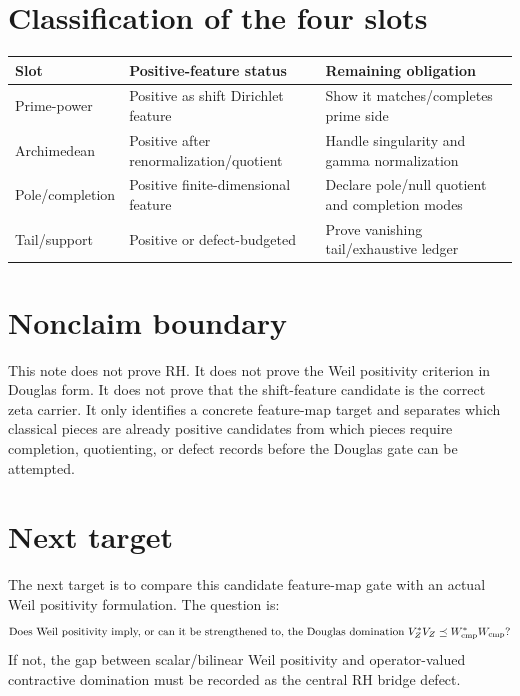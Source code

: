 \documentclass[11pt]{article}
\newcommand{\Wcmp}{W_{\rm cmp}}
\begin{document}
\section{Classification of the four slots}
\begin{center}
\begin{tabular}{lll}
Slot & Positive-feature status & Remaining obligation\\
\hline
Prime-power & Positive as shift Dirichlet feature & Show it matches/completes prime side\\
Archimedean & Positive after renormalization/quotient & Handle singularity and gamma normalization\\
Pole/completion & Positive finite-dimensional feature & Declare pole/null quotient and completion modes\\
Tail/support & Positive or defect-budgeted & Prove vanishing tail/exhaustive ledger\\
\end{tabular}
\end{center}

\section{Nonclaim boundary}
This note does not prove RH.  It does not prove the Weil positivity criterion in
Douglas form.  It does not prove that the shift-feature candidate is the correct
zeta carrier.  It only identifies a concrete feature-map target and separates
which classical pieces are already positive candidates from which pieces require
completion, quotienting, or defect records before the Douglas gate can be
attempted.

\section{Next target}
The next target is to compare this candidate feature-map gate with an actual
Weil positivity formulation.  The question is:
\[
  \text{Does Weil positivity imply, or can it be strengthened to, the Douglas
  domination }V_Z^*V_Z\preceq\Wcmp^*\Wcmp?
\]
If not, the gap between scalar/bilinear Weil positivity and operator-valued
contractive domination must be recorded as the central RH bridge defect.
\end{document}

